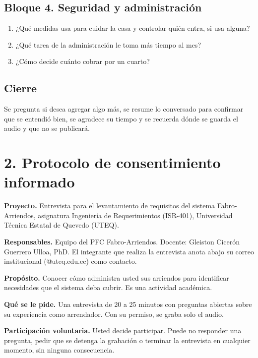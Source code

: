 \documentclass[11pt,a4paper]{article}
\begin{document}
\subsection*{Bloque 4. Seguridad y administración}
\begin{enumerate}[label=\textbf{G\arabic*.},start=12]
\item ¿Qué medidas usa para cuidar la casa y controlar quién entra, si usa alguna?
\item ¿Qué tarea de la administración le toma más tiempo al mes?
\item ¿Cómo decide cuánto cobrar por un cuarto?
\end{enumerate}

\subsection*{Cierre}
Se pregunta si desea agregar algo más, se resume lo conversado para confirmar que se entendió bien, se agradece su tiempo y se recuerda dónde se guarda el audio y que no se publicará.


\clearpage

\section*{2. Protocolo de consentimiento informado}
\small
\textbf{Proyecto.} Entrevista para el levantamiento de requisitos del sistema Fabro-Arriendos, asignatura Ingeniería de Requerimientos (ISR-401), Universidad Técnica Estatal de Quevedo (UTEQ).

\textbf{Responsables.} Equipo del PFC Fabro-Arriendos. Docente: Gleiston Cicerón Guerrero Ulloa, PhD. El integrante que realiza la entrevista anota abajo su correo institucional (@uteq.edu.ec) como contacto.

\textbf{Propósito.} Conocer cómo administra usted sus arriendos para identificar necesidades que el sistema deba cubrir. Es una actividad académica.

\textbf{Qué se le pide.} Una entrevista de 20 a 25 minutos con preguntas abiertas sobre su experiencia como arrendador. Con su permiso, se graba solo el audio.

\textbf{Participación voluntaria.} Usted decide participar. Puede no responder una pregunta, pedir que se detenga la grabación o terminar la entrevista en cualquier momento, sin ninguna consecuencia.
\end{document}
